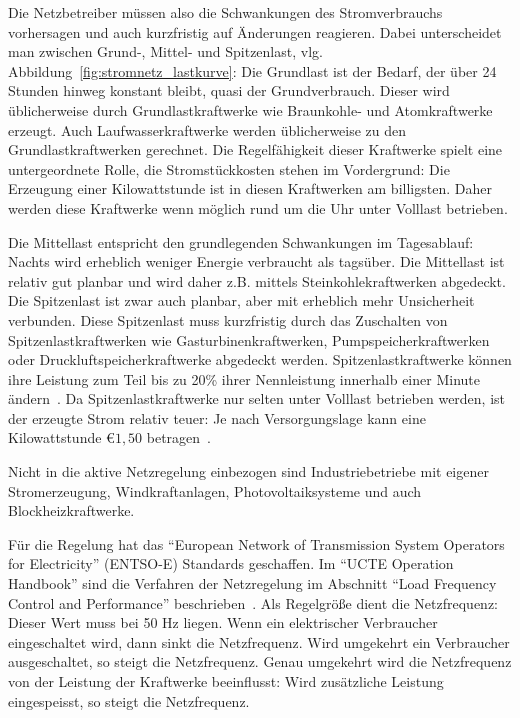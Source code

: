\documentclass[12pt,BCOR=8.5mm]{scrartcl}
\begin{document}
\begin{enumerate}
    Die Netzbetreiber müssen also die Schwankungen des Stromverbrauchs
    vorhersagen und auch kurzfristig auf Änderungen reagieren. Dabei
    unterscheidet man zwischen Grund-, Mittel- und Spitzenlast, vlg.
    Abbildung~\ref{fig:stromnetz_lastkurve}: Die
    Grundlast ist der Bedarf, der über 24 Stunden hinweg konstant
    bleibt, quasi der Grundverbrauch. Dieser wird üblicherweise durch
    Grundlastkraftwerke wie Braunkohle- und Atomkraftwerke erzeugt. Auch
    Laufwasserkraftwerke werden üblicherweise zu den
    Grundlastkraftwerken gerechnet. Die Regelfähigkeit dieser Kraftwerke
    spielt eine untergeordnete Rolle, die Stromstückkosten stehen im
    Vordergrund: Die Erzeugung einer Kilowattstunde ist in diesen
    Kraftwerken am billigsten. Daher werden diese Kraftwerke wenn
    möglich rund um die Uhr unter Volllast betrieben.

    Die Mittellast entspricht den grundlegenden Schwankungen im
    Tagesablauf: Nachts wird erheblich weniger Energie verbraucht als
    tagsüber. Die Mittellast ist relativ gut planbar und
    wird daher z.B. mittels Steinkohlekraftwerken abgedeckt. Die
    Spitzenlast ist zwar auch planbar, aber mit erheblich mehr
    Unsicherheit verbunden. Diese Spitzenlast muss kurzfristig durch das
    Zuschalten von Spitzenlastkraftwerken wie Gasturbinenkraftwerken,
    Pumpspeicherkraftwerken oder Druckluftspeicherkraftwerke abgedeckt
    werden. Spitzenlastkraftwerke können ihre Leistung zum Teil bis zu
    20\% ihrer Nennleistung innerhalb einer Minute
    ändern~\cite{wikipedia10spitzenlast}. Da Spitzenlastkraftwerke
    nur selten unter Volllast betrieben werden, ist der erzeugte Strom
    relativ teuer: Je nach Versorgungslage kann eine Kilowattstunde
    $\euro 1,50$ betragen~\cite{wikipedia10regelleistung}. 

    Nicht in die aktive Netzregelung einbezogen sind Industriebetriebe
    mit eigener Stromerzeugung, Windkraftanlagen, Photovoltaiksysteme
    und auch Blockheizkraftwerke. 

    Für die Regelung hat das "`European Network of Transmission System
    Operators for Electricity"' (ENTSO-E) Standards geschaffen. Im
    "`UCTE Operation Handbook"' sind die Verfahren der Netzregelung im
    Abschnitt "`Load Frequency Control and Performance"'
    beschrieben~\cite{entsoe10ucte}. Als Regelgröße dient die
    Netzfrequenz: Dieser Wert muss bei 50 Hz liegen. Wenn ein
    elektrischer Verbraucher eingeschaltet wird, dann sinkt die
    Netzfrequenz. Wird umgekehrt ein Verbraucher ausgeschaltet, so
    steigt die Netzfrequenz. Genau umgekehrt wird die Netzfrequenz von
    der Leistung der Kraftwerke beeinflusst: Wird zusätzliche Leistung
    eingespeisst, so steigt die Netzfrequenz.


\end{enumerate}
\end{document}
